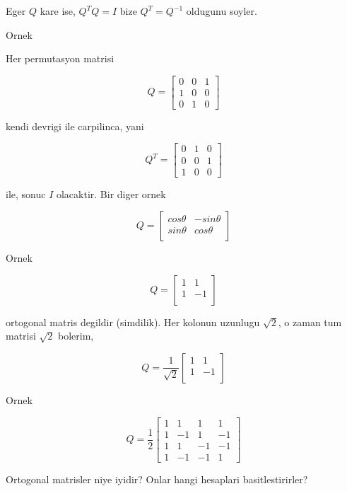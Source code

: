 \documentclass[12pt,fleqn]{article}\usepackage{../common}
\begin{document}
Eger $Q$ kare ise, $Q^TQ = I$  bize $Q^T = Q^{-1}$ oldugunu soyler. 

Ornek 

Her permutasyon matrisi 

\[ 
Q = 
\left[\begin{array}{rrr}
0 & 0 & 1 \\
1 & 0 & 0 \\
0 & 1 & 0 
\end{array}\right]
 \]

kendi devrigi ile carpilinca, yani 

\[ 
Q^T = 
\left[\begin{array}{rrr}
0 & 1 & 0 \\
0 & 0 & 1 \\
1 & 0 & 0 
\end{array}\right]
 \]

ile, sonuc $I$ olacaktir. Bir diger ornek 

\[ Q = 
\left[\begin{array}{cc}
cos \theta & -sin \theta \\
sin \theta & cos \theta \\
\end{array}\right]
 \]


Ornek

\[ Q = 
\left[\begin{array}{cc}
1 & 1 \\
1 & -1 \\
\end{array}\right]
 \]

ortogonal matris degildir (simdilik). Her kolonun uzunlugu $\sqrt{2}$, o
zaman tum matrisi $\sqrt{2}$ bolerim,

\[ Q = \frac{1}{\sqrt{2}}
\left[\begin{array}{cc}
1 & 1 \\
1 & -1 \\
\end{array}\right]
 \]

Ornek 

\[ Q = \frac{ 1}{2}
\left[\begin{array}{rrrr}
1 & 1& 1& 1 \\
1 & -1& 1& -1 \\
1 & 1& -1& -1 \\
1 & -1& -1& 1 
\end{array}\right]
 \]

Ortogonal matrisler niye iyidir? Onlar hangi hesaplari basitlestirirler? 
\end{document}
